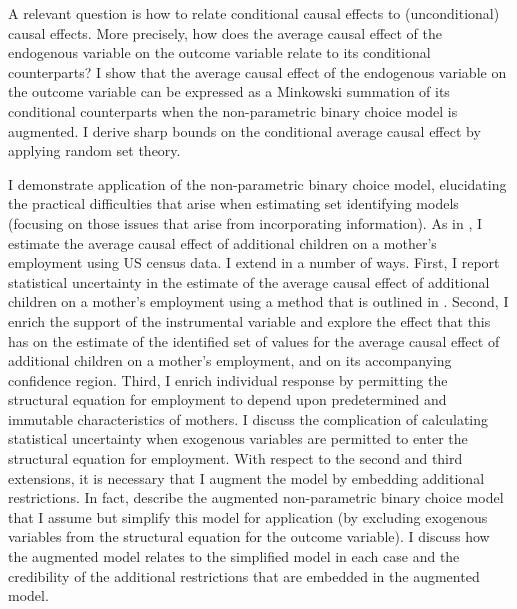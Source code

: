 \documentclass[12pt,a4paper,twoside]{article}
\numberwithin{equation}{section}
\begin{document}
A relevant question is how to relate conditional causal effects to (unconditional) causal effects. More precisely, how does the average causal effect of the endogenous variable on the outcome variable relate to its conditional counterparts? I show that the average causal effect of the endogenous variable on the outcome variable can be expressed as a Minkowski summation of its conditional counterparts when the non-parametric binary choice model is augmented. I derive sharp bounds on the conditional average causal effect by applying random set theory. 

I demonstrate application of the non-parametric binary choice model, elucidating the practical difficulties that arise when estimating set identifying models (focusing on those issues that arise from incorporating information). As in \cite{cr13}, I estimate the average causal effect of additional children on a mother's employment using US census data. I extend \cite{cr13} in a number of ways. First, I report statistical uncertainty in the estimate of the average causal effect of additional children on a mother's employment using a method that is outlined in \cite{cHlr13}. Second, I enrich the support of the instrumental variable and explore the effect that this has on the estimate of the identified set of values for the average causal effect of additional children on a mother's employment, and on its accompanying confidence region. Third, I enrich individual response by permitting the structural equation for employment to depend upon predetermined and immutable characteristics of mothers. I discuss the complication of calculating statistical uncertainty when exogenous variables are permitted to enter the structural equation for employment. With respect to the second and third extensions, it is necessary that I augment the model by embedding additional restrictions. In fact, \cite{cr13} describe the augmented non-parametric binary choice model that I assume but simplify this model for application (by excluding exogenous variables from the structural equation for the outcome variable). I discuss how the augmented model relates to the simplified model in each case and the credibility of the additional restrictions that are embedded in the augmented model.
\end{document}
